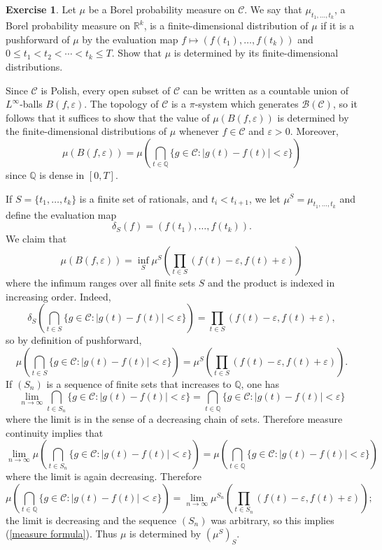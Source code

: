 \documentclass[10pt]{article}
\newcommand{\QQ}{\mathbb{Q}}
\newcommand{\RR}{\mathbb{R}}
\theoremstyle{definition}
\newtheorem{exer}{Exercise}
\begin{document}
\begin{exer}
Let $\mu$ be a Borel probability measure on $\mathcal C$.
We say that $\mu_{t_1, \dots, t_k}$, a Borel probability measure on $\RR^k$, is a finite-dimensional distribution of $\mu$ if it is a pushforward of $\mu$ by the evaluation map $f \mapsto (f(t_1), \dots, f(t_k))$ and $0 \leq t_1 < t_2 < \cdots < t_k \leq T$. Show that $\mu$ is determined by its finite-dimensional distributions.
\end{exer}

Since $\mathcal C$ is Polish, every open subset of $\mathcal C$ can be written as a countable union of $L^\infty$-balls $B(f, \varepsilon)$.
The topology of $\mathcal C$ is a $\pi$-system which generates $\mathcal B(\mathcal C)$, so it follows that it suffices to show that the value of $\mu(B(f, \varepsilon))$ is determined by the finite-dimensional distributions of $\mu$ whenever $f \in \mathcal C$ and $\varepsilon > 0$.
Moreover,
$$\mu(B(f, \varepsilon)) = \mu\left(\bigcap_{t \in \QQ} \{g \in \mathcal C: |g(t) - f(t)| < \varepsilon\}\right)$$
since $\QQ$ is dense in $[0, T]$.

If $S = \{t_1, \dots, t_k\}$ is a finite set of rationals, and $t_i < t_{i+1}$, we let $\mu^S = \mu_{t_1, \dots, t_k}$ and define the evaluation map
$$\delta_S(f) = (f(t_1), \dots, f(t_k)).$$
We claim that
\begin{equation}
\label{measure formula}
\mu(B(f, \varepsilon)) = \inf_S \mu^S\left(\prod_{t \in S} (f(t) - \varepsilon, f(t) + \varepsilon)\right)
\end{equation}
where the infimum ranges over all finite sets $S$ and the product is indexed in increasing order.
Indeed,
$$\delta_S\left(\bigcap_{t \in S} \{g \in \mathcal C: |g(t) - f(t)| < \varepsilon\}\right) = \prod_{t \in S} (f(t) - \varepsilon, f(t) + \varepsilon),$$
so by definition of pushforward,
$$\mu\left(\bigcap_{t \in S} \{g \in \mathcal C: |g(t) - f(t)| < \varepsilon\}\right) = \mu^S\left(\prod_{t \in S} (f(t) - \varepsilon, f(t) + \varepsilon)\right).$$
If $(S_n)$ is a sequence of finite sets that increases to $\QQ$, one has
$$\lim_{n \to \infty} \bigcap_{t \in S_n} \{g \in \mathcal C: |g(t) - f(t)| < \varepsilon\} = \bigcap_{t \in \QQ} \{g \in \mathcal C: |g(t) - f(t)| < \varepsilon\}$$
where the limit is in the sense of a decreasing chain of sets.
Therefore measure continuity implies that
$$\lim_{n \to \infty} \mu\left(\bigcap_{t \in S_n} \{g \in \mathcal C: |g(t) - f(t)| < \varepsilon\}\right) = \mu\left(\bigcap_{t \in \QQ} \{g \in \mathcal C: |g(t) - f(t)| < \varepsilon\}\right)$$
where the limit is again decreasing. Therefore
$$\mu\left(\bigcap_{t \in \QQ} \{g \in \mathcal C: |g(t) - f(t)| < \varepsilon\}\right) = \lim_{n \to \infty} \mu^{S_n}\left(\prod_{t \in S_n} (f(t) - \varepsilon, f(t) + \varepsilon)\right);$$
the limit is decreasing and the sequence $(S_n)$ was arbitrary, so this implies (\ref{measure formula}).
Thus $\mu$ is determined by $(\mu^S)_S$.
\end{document}
